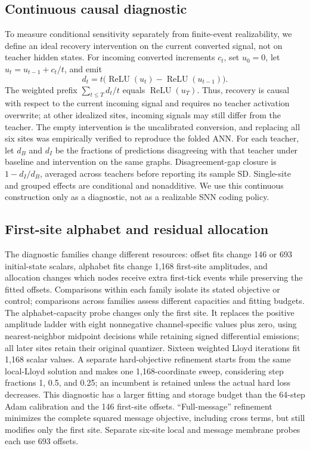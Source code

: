 \documentclass{article}
\begin{document}
\subsection{Continuous causal diagnostic}

\label{sec:continuous_causal_diagnostic}

To measure conditional sensitivity separately from finite-event realizability, we define an ideal recovery intervention on the current converted signal, not on teacher hidden states. For incoming converted increments $c_t$, set $u_0=0$, let $u_t=u_{t-1}+c_t/t$, and emit
\[
d_t=t\bigl(\operatorname{ReLU}(u_t)-\operatorname{ReLU}(u_{t-1})\bigr).
\]
The weighted prefix $\sum_{t\leq T}d_t/t$ equals $\operatorname{ReLU}(u_T)$. Thus, recovery is causal with respect to the current incoming signal and requires no teacher activation overwrite; at other idealized sites, incoming signals may still differ from the teacher. The empty intervention is the uncalibrated conversion, and replacing all six sites was empirically verified to reproduce the folded ANN. For each teacher, let $d_B$ and $d_I$ be the fractions of predictions disagreeing with that teacher under baseline and intervention on the same graphs. Disagreement-gap closure is $1-d_I/d_B$, averaged across teachers before reporting its sample SD. Single-site and grouped effects are conditional and nonadditive. We use this continuous construction only as a diagnostic, not as a realizable SNN coding policy.

\subsection{First-site alphabet and residual allocation}

\label{sec:first_site_alphabet_and_residual_allocat}

The diagnostic families change different resources: offset fits change 146 or 693 initial-state scalars, alphabet fits change 1,168 first-site amplitudes, and allocation changes which nodes receive extra first-tick events while preserving the fitted offsets. Comparisons within each family isolate its stated objective or control; comparisons across families assess different capacities and fitting budgets. The alphabet-capacity probe changes only the first site. It replaces the positive amplitude ladder with eight nonnegative channel-specific values plus zero, using nearest-neighbor midpoint decisions while retaining signed differential emissions; all later sites retain their original quantizer. Sixteen weighted Lloyd iterations fit 1,168 scalar values. A separate hard-objective refinement starts from the same local-Lloyd solution and makes one 1,168-coordinate sweep, considering step fractions 1, 0.5, and 0.25; an incumbent is retained unless the actual hard loss decreases. This diagnostic has a larger fitting and storage budget than the 64-step Adam calibration and the 146 first-site offsets. ``Full-message'' refinement minimizes the complete squared message objective, including cross terms, but still modifies only the first site. Separate six-site local and message membrane probes each use 693 offsets.
\end{document}
